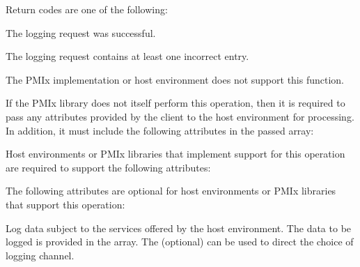 Return codes are one of the following:

\begin{constantdesc}
    \item {} The logging request was successful.
    \item {} The logging request contains at least one incorrect entry.
    \item {} The \ac{PMIx} implementation or host environment does not support this function.
\end{constantdesc}

\reqattrstart
If the \ac{PMIx} library does not itself perform this operation, then it is required to pass any attributes provided by the client to the host environment for processing. In addition, it must include the following attributes in the passed  array:


\divider

Host environments or \ac{PMIx} libraries that implement support for this operation are required to support the following attributes:


\reqattrend

\optattrstart
The following attributes are optional for host environments or \ac{PMIx} libraries that support this operation:


\optattrend

\descr

Log data subject to the services offered by the host environment. The data to be logged is provided in the  array. The (optional)  can be used to direct the choice of logging channel.

